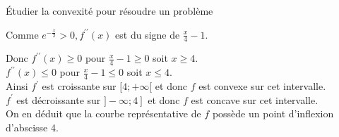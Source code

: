 \begin{bmethodet}{Étudier la convexité pour résoudre un problème}
\begin{enumMet}
		\item Comme \(e^{-\frac{x}{2}}>0, f^{\prime \prime}(x)\) est du signe de \(\frac{x}{4}-1\).
		
		Donc \(f^{\prime \prime}(x) \geq 0\) pour \(\frac{x}{4}-1 \geq 0\) soit \(x \geq 4\).\\
		\(f^{\prime \prime}(x) \leq 0\) pour \(\frac{x}{4}-1 \leq 0\) soit \(x \leq 4\).\\
		Ainsi \(f^{\prime}\) est croissante sur \([4 ;+\infty[\) et donc \(f\) est convexe sur cet intervalle.\\
		\(f^{\prime}\) est décroissante sur \(\left.]-\infty ; 4\right]\) et donc \(f\) est concave sur cet intervalle.\\
		On en déduit que la courbe représentative de \(f\) possède un point d'inflexion d'abscisse 4.
	\end{enumMet}
\end{bmethodet}
